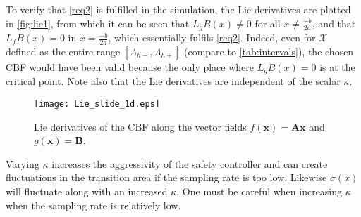 To verify that \autoref{req2} is fulfilled in the simulation, the Lie derivatives are plotted in \autoref{fig:lie1}, from which it can be seen that $L_gB(x) \neq 0$ for all $x \neq \frac{-b}{2a}$, and that $L_fB(x)=0$ in $x = \frac{-b}{2a}$, which essentially fulfils \autoref{req2}. Indeed, even for $\mathcal{X}$ defined as the entire range $[\Lambda_{h-},\Lambda_{h+}]$ (compare to \autoref{tab:intervals}), the chosen CBF would have been valid because the only place where $L_gB(x) = 0$ is at the critical point. Note also that the Lie derivatives are independent of the scalar $\kappa$.
\begin{figure}[H]
\hspace{-7mm}
		\texttt{[image: Lie\_slide\_1d.eps]}
	\caption{Lie derivatives of the CBF along the vector fields $f(\mathbf{x}) = \textbf{Ax}$ and $g(\mathbf{x})=\mathbf{B}$. %
		}
	\label{fig:lie1}
\end{figure}

Varying $\kappa$ increases the aggressivity of the safety controller and can create fluctuations in the transition area if the sampling rate is too low. Likewise $\sigma(x)$ will fluctuate along with an increased $\kappa$. One must be careful when increasing $\kappa$ when the sampling rate is relatively low. %


